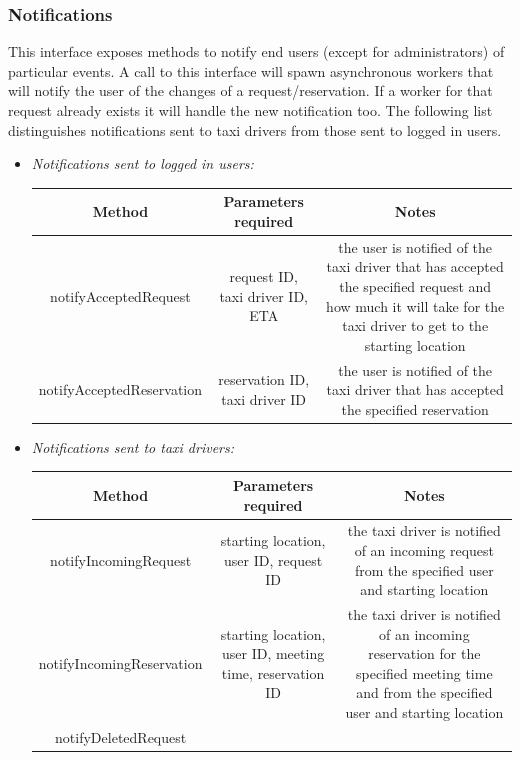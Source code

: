 \documentclass{article}
\begin{document}
\begin{itemize}
\subsubsection{Notifications}
This interface exposes methods to notify end users (except for administrators) of particular events. 
A call to this interface will spawn asynchronous workers that will notify the user of the changes of a request/reservation.
If a worker for that request already exists it will handle the new notification too.
The following list distinguishes notifications sent to taxi drivers from those sent to logged in users.
\begin{itemize}
	\item \textit{Notifications sent to logged in users:} \\
		\begin{adjustbox}{width=1.2\textwidth}	
			\begin{tabular}{*{3}{c}}
				\toprule
				Method & Parameters required & Notes \\
				\midrule
				notifyAcceptedRequest & request ID, taxi driver ID, ETA & the user is notified of the taxi driver that has accepted the specified request and how much it will take for the taxi driver to get to the starting location\\ 
				notifyAcceptedReservation & reservation ID, taxi driver ID & the user is notified of the taxi driver that has accepted the specified reservation \\
				\bottomrule
			\end{tabular}
		\end{adjustbox}	
	\item \textit{Notifications sent to taxi drivers:} \\
		\begin{adjustbox}{width=1.2\textwidth}	
			\begin{tabular}{*{3}{c}}
				\toprule
				Method & Parameters required & Notes \\
				\midrule
				notifyIncomingRequest & starting location, user ID, request ID & the taxi driver is notified of an incoming request from the specified user and starting location\\ 
				notifyIncomingReservation & starting location, user ID, meeting time, reservation ID & the taxi driver is notified of an incoming reservation for the specified meeting time and from the specified user and starting location \\
				notifyDeletedRequest %
				\bottomrule
			\end{tabular}
		\end{adjustbox}	
\end{itemize}		
\end{itemize}
\end{document}
